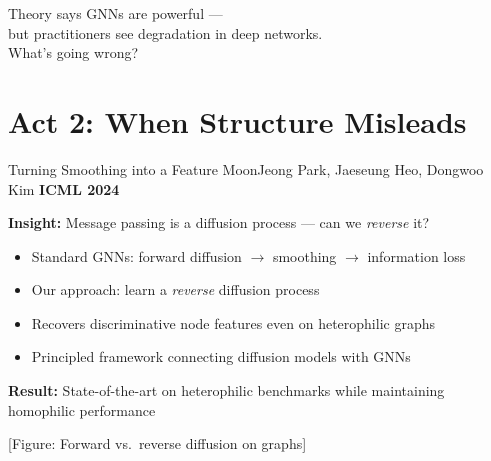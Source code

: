 \documentclass[aspectratio=169,11pt]{beamer}
\newcommand{\papercite}[1]{{\scriptsize\color{mutedText}#1}}
\newcommand{\venue}[1]{{\small\textcolor{postechBlue}{\textbf{#1}}}}
\begin{document}
\begin{frame}[plain]
  \vspace{2cm}
  \begin{center}
    {\Large\textcolor{postechBlue}{Theory says GNNs are powerful ---}}\\[8pt]
    {\Large\textcolor{postechBlue}{but practitioners see degradation in deep networks.}}\\[16pt]
    {\large\textcolor{mutedText}{What's going wrong?}}
  \end{center}
\end{frame}

\section{Act 2: When Structure Misleads}

\begin{frame}{Turning Smoothing into a Feature}
  \papercite{MoonJeong Park, Jaeseung Heo, Dongwoo Kim \hfill \venue{ICML 2024}}
  \vspace{8pt}

  \textbf{Insight:} Message passing is a \alert{diffusion process} --- can we \textit{reverse} it?
  \vspace{6pt}

  \begin{itemize}
    \item Standard GNNs: forward diffusion $\to$ smoothing $\to$ information loss
    \item Our approach: learn a \textit{reverse} diffusion process
    \item Recovers discriminative node features even on heterophilic graphs
    \item Principled framework connecting diffusion models with GNNs
  \end{itemize}
  \vspace{8pt}

  \textbf{Result:} State-of-the-art on heterophilic benchmarks while maintaining homophilic performance

  \begin{center}
    {\small\color{mutedText}[Figure: Forward vs.\ reverse diffusion on graphs]}
  \end{center}
\end{frame}
\end{document}
